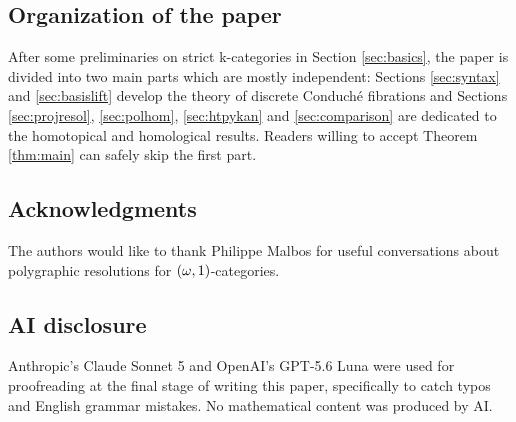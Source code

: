 \subsection*{Organization of the paper}
After some preliminaries on strict \ook k-categories in
Section \ref{sec:basics}, the paper is divided into two main parts which are mostly
independent: Sections \ref{sec:syntax} and \ref{sec:basislift} develop the theory of discrete Conduché fibrations and Sections
\ref{sec:projresol}, \ref{sec:polhom}, \ref{sec:htpykan} and \ref{sec:comparison} are dedicated to the homotopical and homological
results. Readers willing to accept Theorem \ref{thm:main} can safely
skip the first part.
\subsection*{Acknowledgments}
The authors would like to thank Philippe Malbos for useful conversations about polygraphic resolutions for $(\omega,1)$\nbd-categories.
\subsection*{AI disclosure} Anthropic's Claude Sonnet 5 and OpenAI's
GPT-5.6 Luna were used for proofreading at the final stage of writing this paper, specifically to catch typos and English grammar
mistakes. No mathematical content was produced by AI.

